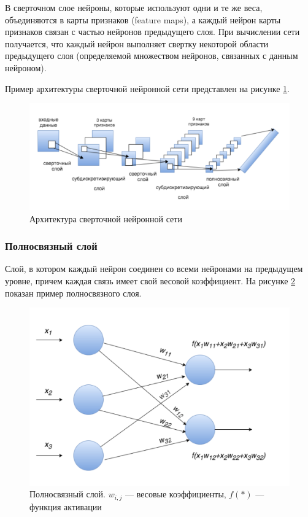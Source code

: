 В сверточном слое нейроны, которые используют одни и те же веса, объединяются в карты признаков (feature maps), а каждый нейрон карты признаков связан с частью нейронов предыдущего слоя. При вычислении сети получается, что каждый нейрон выполняет свертку некоторой области предыдущего слоя (определяемой множеством нейронов, связанных с данным нейроном).

Пример архитектуры сверточной нейронной сети представлен на рисунке \ref{fig:convnet}.
\begin{figure}[ht]
    \centering
    \includegraphics [width=\textwidth*2/3] {images/convnet.png}
    \caption{ Архитектура сверточной нейронной сети}
    \label{fig:convnet}
\end{figure}

\subsubsection{Полносвязный слой} \label{fc_layers}
Слой, в котором каждый нейрон соединен со всеми нейронами на предыдущем уровне, причем каждая связь имеет свой весовой коэффициент. На рисунке \ref{fig:fc_layer} показан пример полносвязного слоя.

\begin{figure}[ht]
    \centering
    \includegraphics [width=\textwidth*2/3] {images/fc_layer.png}
    \caption{Полносвязный слой. $w_{i,j}$ — весовые коэффициенты, $f(*)$ — функция активации}
    \label{fig:fc_layer}
\end{figure}

